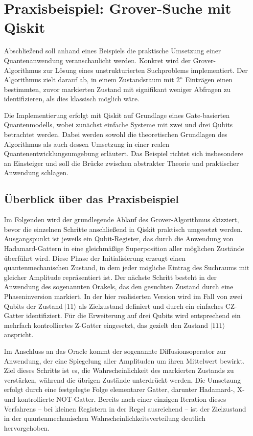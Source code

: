 \section{Praxisbeispiel: Grover-Suche mit Qiskit}
\label{sec:practical-example}

Abschließend soll anhand eines Beispiels die praktische Umsetzung einer Quantenanwendung veranschaulicht werden. Konkret wird der Grover-Algorithmus zur Lösung eines unstrukturierten Suchproblems implementiert. Der Algorithmus zielt darauf ab, in einem Zustandsraum mit $2^n$ Einträgen einen bestimmten, zuvor markierten Zustand mit signifikant weniger Abfragen zu identifizieren, als dies klassisch möglich wäre.

Die Implementierung erfolgt mit Qiskit auf Grundlage eines Gate-basierten Quantenmodells, wobei zunächst einfache Systeme mit zwei und drei Qubits betrachtet werden. Dabei werden sowohl die theoretischen Grundlagen des Algorithmus als auch dessen Umsetzung in einer realen Quantenentwicklungsumgebung erläutert. Das Beispiel richtet sich insbesondere an Einsteiger und soll die Brücke zwischen abstrakter Theorie und praktischer Anwendung schlagen.

\subsection{Überblick über das Praxisbeispiel}

Im Folgenden wird der grundlegende Ablauf des Grover-Algorithmus skizziert, bevor die einzelnen Schritte anschließend in Qiskit praktisch umgesetzt werden. Ausgangspunkt ist jeweils ein Qubit-Register, das durch die Anwendung von Hadamard-Gattern in eine gleichmäßige Superposition aller möglichen Zustände überführt wird. Diese Phase der Initialisierung erzeugt einen quantenmechanischen Zustand, in dem jeder mögliche Eintrag des Suchraums mit gleicher Amplitude repräsentiert ist. Der nächste Schritt besteht in der Anwendung des sogenannten Orakels, das den gesuchten Zustand durch eine Phaseninversion markiert. In der hier realisierten Version wird im Fall von zwei Qubits der Zustand $|11\rangle$ als Zielzustand definiert und durch ein einfaches CZ-Gatter identifiziert. Für die Erweiterung auf drei Qubits wird entsprechend ein mehrfach kontrolliertes Z-Gatter eingesetzt, das gezielt den Zustand $|111\rangle$ anspricht.

Im Anschluss an das Oracle kommt der sogenannte Diffusionsoperator zur Anwendung, der eine Spiegelung aller Amplituden um ihren Mittelwert bewirkt. Ziel dieses Schritts ist es, die Wahrscheinlichkeit des markierten Zustands zu verstärken, während die übrigen Zustände unterdrückt werden. Die Umsetzung erfolgt durch eine festgelegte Folge elementarer Gatter, darunter Hadamard-, X- und kontrollierte NOT-Gatter. Bereits nach einer einzigen Iteration dieses Verfahrens – bei kleinen Registern in der Regel ausreichend – ist der Zielzustand in der quantenmechanischen Wahrscheinlichkeitsverteilung deutlich hervorgehoben.

